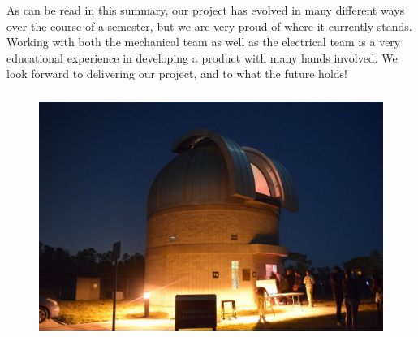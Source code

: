 \documentclass[12pt]{report}
\begin{document}
As can be read in this summary, our project has evolved in many different ways over the course of a semester, but we are very proud of where it currently stands. Working with both the mechanical team as well as the electrical team is a very educational experience in developing a product with many hands involved. We look forward to delivering our project, and to what the future holds!

\begin{figure}[h]
	\centering
	\includegraphics[width=0.8\linewidth, height=8.0cm]{tele}
\end{figure}

\printbibliography[title={References}]
\end{document}
